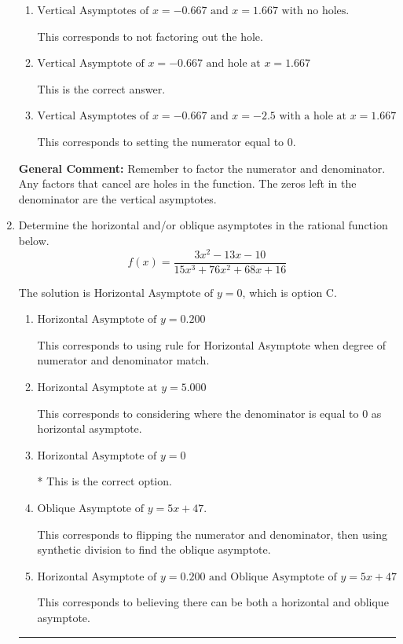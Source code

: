 \documentclass{extbook}[14pt]
\newcommand{\litem}[1]{\item #1

\rule{\textwidth}{0.4pt}}
\begin{document}
\begin{enumerate}
{\begin{enumerate}[label=\Alph*.]
This corresponds to considering where the denominator is equal to 0 as holes.
\item \( \text{Vertical Asymptotes of } x = -0.667 \text{ and } x = 1.667 \text{ with no holes.} \)

This corresponds to not factoring out the hole.
\item \( \text{Vertical Asymptote of } x = -0.667 \text{ and hole at } x = 1.667 \)

This is the correct answer.
\item \( \text{Vertical Asymptotes of } x = -0.667 \text{ and } x = -2.5 \text{ with a hole at } x = 1.667 \)

This corresponds to setting the numerator equal to 0.
\end{enumerate}

\textbf{General Comment:} Remember to factor the numerator and denominator. Any factors that cancel are holes in the function. The zeros left in the denominator are the vertical asymptotes.
}
\litem{
Determine the horizontal and/or oblique asymptotes in the rational function below.
\[ f(x) = \frac{3x^{2} -13 x -10}{15x^{3} +76 x^{2} +68 x + 16} \]

The solution is \( \text{Horizontal Asymptote of } y = 0 \), which is option C.\begin{enumerate}[label=\Alph*.]
\item \( \text{Horizontal Asymptote of } y = 0.200  \)

This corresponds to using rule for Horizontal Asymptote when degree of numerator and denominator match.
\item \( \text{Horizontal Asymptote at } y = 5.000 \)

This corresponds to considering where the denominator is equal to 0 as horizontal asymptote.
\item \( \text{Horizontal Asymptote of } y = 0 \)

* This is the correct option.
\item \( \text{Oblique Asymptote of } y = 5x + 47. \)

This corresponds to flipping the numerator and denominator, then using synthetic division to find the oblique asymptote.
\item \( \text{Horizontal Asymptote of } y = 0.200 \text{ and Oblique Asymptote of } y = 5x + 47 \)

This corresponds to believing there can be both a horizontal and oblique asymptote.
\end{enumerate}

}
\end{enumerate}
\end{document}
